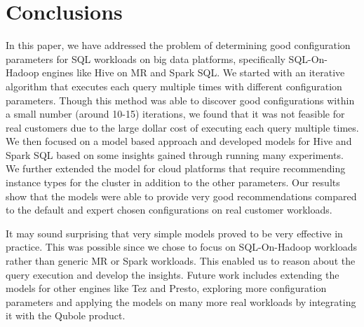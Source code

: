 \section{Conclusions}
\label{sec:conclusions}
In this paper, we have addressed the problem of determining good configuration parameters for SQL workloads on big data platforms, specifically SQL-On-Hadoop engines like Hive on MR and Spark SQL. We started with an iterative algorithm that executes each query multiple times with different configuration parameters. Though this method was able to discover good configurations within a small number (around 10-15) iterations, we found that it was not feasible for real customers due to the large dollar cost of executing each query multiple times. We then focused on a model based approach and developed models for Hive and Spark SQL based on some insights gained through running many experiments. We further extended the model for cloud platforms that require recommending instance types for the cluster in addition to the other parameters. Our results show that the models were able to provide very good recommendations compared to the default and expert chosen configurations on real customer workloads. 

It may sound surprising that very simple models proved to be very effective in practice. This was possible since we chose to focus on SQL-On-Hadoop workloads rather than generic MR or Spark workloads. This enabled us to reason about the query execution and develop the insights. Future work includes extending the models for other engines like Tez and Presto, exploring more configuration parameters and applying the models on many more real workloads by integrating it with the Qubole product. 